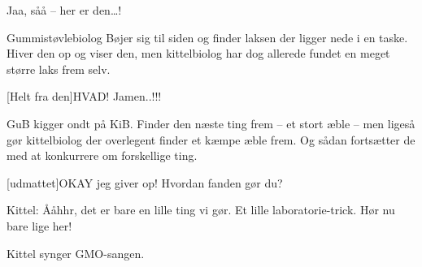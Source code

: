 \documentclass[a4paper,12pt]{article}
\begin{document}
\begin{sketch}
Jaa, såå -- her er den…!

\scene Gummistøvlebiolog Bøjer sig til siden og finder laksen der ligger nede i en taske. Hiver den op og viser den, men kittelbiolog har dog allerede fundet en meget større laks frem selv. 

[Helt fra den]HVAD! Jamen..!!!

\scene GuB kigger ondt på KiB. Finder den næste ting frem – et stort æble – men ligeså gør kittelbiolog der overlegent finder et kæmpe æble frem. Og sådan fortsætter de med at konkurrere om forskellige ting.

[udmattet]OKAY jeg giver op! Hvordan fanden gør du?

Kittel: Ååhhr, det er bare en lille ting vi gør. Et lille laboratorie-trick. Hør nu bare lige her!

\scene Kittel synger GMO-sangen.



\end{sketch}
\end{document}
